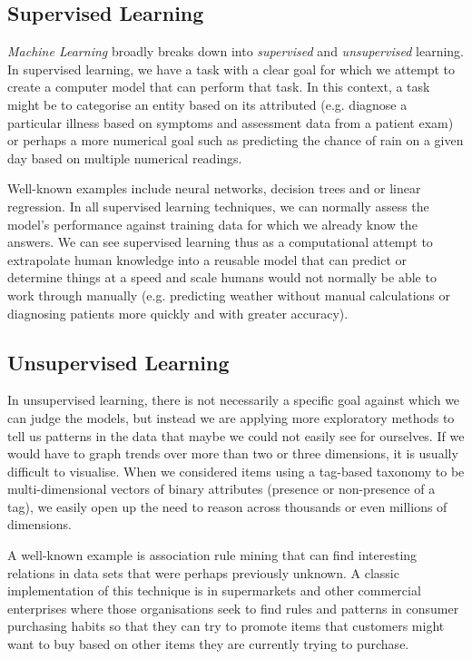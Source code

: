 \subsection{Supervised Learning}

\emph{Machine Learning} broadly breaks down into \emph{supervised}
and \emph{unsupervised} learning. In supervised learning, we have
a task with a clear goal for which we attempt to create a computer
model that can perform that task. In this context, a task might be
to categorise an entity based on its attributed (e.g. diagnose
a particular illness based on symptoms and assessment data from a
patient exam) or perhaps a more numerical goal such as predicting
the chance of rain on a given day based on multiple numerical
readings.

Well-known examples include neural networks, decision trees and or
linear regression. In all supervised learning techniques, we can
normally assess the model's performance against training data for
which we already know the answers. We can see supervised learning
thus as a computational attempt to extrapolate human knowledge into
a reusable model that can predict or determine things at a speed
and scale humans would not normally be able to work through manually
(e.g. predicting weather without manual calculations or diagnosing
patients more quickly and with greater accuracy).

\subsection{Unsupervised Learning}

In unsupervised learning, there is not necessarily a specific goal
against which we can judge the models, but instead we are applying
more exploratory methods to tell us patterns in the data that maybe
we could not easily see for ourselves. If we would have to graph trends
over more than two or three dimensions, it is usually difficult to
visualise. When we considered items using a tag-based taxonomy to be
multi-dimensional vectors of binary attributes (presence or non-presence
of a tag), we easily open up the need to reason across thousands or even
millions of dimensions.

A well-known example is association rule mining that can find
interesting relations in data sets that were perhaps previously
unknown. A classic implementation of this technique is in
supermarkets and other commercial enterprises where those
organisations seek to find rules and patterns in consumer purchasing
habits so that they can try to promote items that customers might
want to buy based on other items they are currently trying to
purchase.

